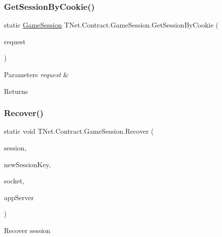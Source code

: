 \subsubsection{\texorpdfstring{Get\+Session\+By\+Cookie()}{GetSessionByCookie()}\hspace{0.1cm}{\footnotesize\ttfamily [2/2]}}
{\footnotesize\ttfamily static \mbox{\hyperlink{class_t_net_1_1_contract_1_1_game_session}{Game\+Session}} T\+Net.\+Contract.\+Game\+Session.\+Get\+Session\+By\+Cookie (\begin{DoxyParamCaption}\item[{Http\+Listener\+Request}]{request }\end{DoxyParamCaption})\hspace{0.3cm}{\ttfamily [static]}}






\begin{DoxyParams}{Parameters}
{\em request} & \\
\hline
\end{DoxyParams}
\begin{DoxyReturn}{Returns}

\end{DoxyReturn}
\mbox{\label{class_t_net_1_1_contract_1_1_game_session_a0c8928b8df7f3eb09c61107d1ce5efe6}} 
\subsubsection{\texorpdfstring{Recover()}{Recover()}}
{\footnotesize\ttfamily static void T\+Net.\+Contract.\+Game\+Session.\+Recover (\begin{DoxyParamCaption}\item[{\mbox{\hyperlink{class_t_net_1_1_contract_1_1_game_session}{Game\+Session}}}]{session,  }\item[{Guid}]{new\+Session\+Key,  }\item[{T\+N\+Socket}]{socket,  }\item[{I\+Socket}]{app\+Server }\end{DoxyParamCaption})\hspace{0.3cm}{\ttfamily [static]}}



Recover session 


